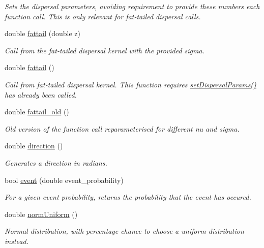 \begin{DoxyCompactItemize}
\begin{DoxyCompactList}\small\item\em Sets the dispersal parameters, avoiding requirement to provide these numbers each function call. This is only relevant for fat-\/tailed dispersal calls. \end{DoxyCompactList}\item 
double \hyperlink{class_n_rrand_a464101f3def678477f9156d0bd1aab54}{fattail} (double z)
\begin{DoxyCompactList}\small\item\em Call from the fat-\/tailed dispersal kernel with the provided sigma. \end{DoxyCompactList}\item 
double \hyperlink{class_n_rrand_a3ec8aae87ae486ddfb5ad481a7972c27}{fattail} ()
\begin{DoxyCompactList}\small\item\em Call from fat-\/tailed dispersal kernel. This function requires \hyperlink{class_n_rrand_a5679f458940de730f527772ca27db5ad}{set\+Dispersal\+Params()} has already been called. \end{DoxyCompactList}\item 
double \hyperlink{class_n_rrand_aab0ec97e2c0f74cf38cc7047356cae5c}{fattail\+\_\+old} ()
\begin{DoxyCompactList}\small\item\em Old version of the function call reparameterised for different nu and sigma. \end{DoxyCompactList}\item 
double \hyperlink{class_n_rrand_aef021289f62893215204589af450bf65}{direction} ()
\begin{DoxyCompactList}\small\item\em Generates a direction in radians. \end{DoxyCompactList}\item 
bool \hyperlink{class_n_rrand_a7c7a2dc1b3f14ebaaa0e6edd6c1d517a}{event} (double event\+\_\+probability)
\begin{DoxyCompactList}\small\item\em For a given event probability, returns the probability that the event has occured. \end{DoxyCompactList}\item 
double \hyperlink{class_n_rrand_ab18277b2f873878602e82672b272c9be}{norm\+Uniform} ()
\begin{DoxyCompactList}\small\item\em Normal distribution, with percentage chance to choose a uniform distribution instead. \end{DoxyCompactList}\item 

\end{DoxyCompactItemize}
